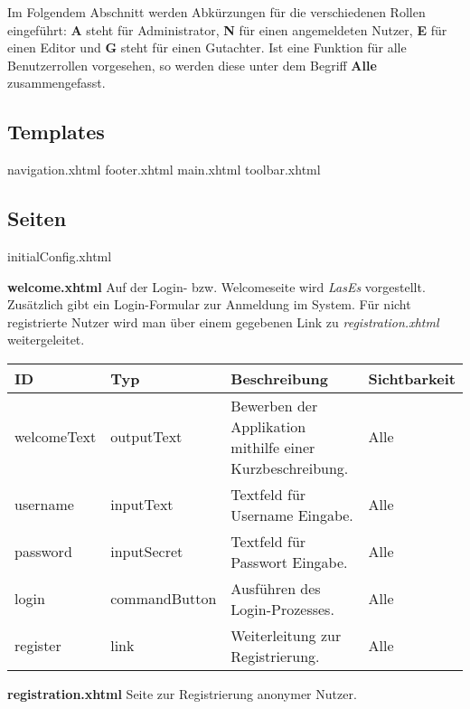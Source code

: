 Im Folgendem Abschnitt werden Abkürzungen für die verschiedenen Rollen eingeführt:
\textbf{A} steht für Administrator, \textbf{N} für einen angemeldeten Nutzer, \textbf{E} für einen Editor und \textbf{G} steht für einen Gutachter.
Ist eine Funktion für alle Benutzerrollen vorgesehen, so werden diese unter dem Begriff \textbf{Alle} zusammengefasst.


\subsection{Templates}
navigation.xhtml
footer.xhtml
main.xhtml
toolbar.xhtml

\subsection{Seiten}
initialConfig.xhtml

\textbf{welcome.xhtml} Auf der Login- bzw. Welcomeseite wird \emph{LasEs} vorgestellt.
Zusätzlich gibt ein Login-Formular zur Anmeldung im System.
Für nicht registrierte Nutzer wird man über einem gegebenen Link zu \emph{registration.xhtml} weitergeleitet.


\begin{tabular}[H]{|m{2cm}|m{3cm}|m{6cm}|m{2.5cm}|}
    \hline
    \textbf{ID} & \textbf{Typ} & \textbf{Beschreibung} & \textbf{Sichtbarkeit} \\
    \hline
    \hline
    welcomeText & outputText & Bewerben der Applikation mithilfe einer Kurzbeschreibung. & Alle \\
    \hline
    username & inputText & Textfeld für Username Eingabe. & Alle \\
    \hline
    password & inputSecret & Textfeld für Passwort Eingabe. & Alle \\
    \hline
    login & commandButton & Ausführen des Login-Prozesses. & Alle \\
    \hline
    register & link & Weiterleitung zur Registrierung. & Alle \\
    \hline
\end{tabular}

\textbf{registration.xhtml} Seite zur Registrierung anonymer Nutzer.

